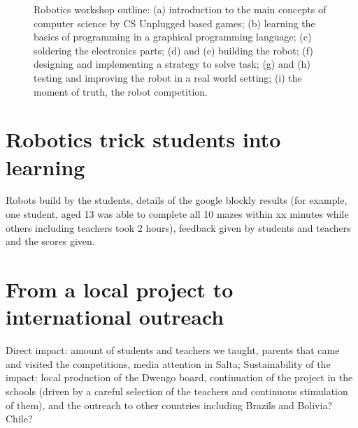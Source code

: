 \documentclass[a4paper]{llncs}
\begin{document}
\begin{figure}[htp]
\caption[]{Robotics workshop outline: (a) introduction to the main concepts of computer science by CS Unplugged based games; (b) learning the basics of programming in a graphical programming language; (c) soldering the electronics parts; (d) and (e) building the robot; (f) designing and implementing a strategy to solve task; (g) and (h) testing and improving the robot in a real world setting; (i) the moment of truth, the robot competition.}
\end{figure}

\section{Robotics trick students into learning}
Robots build by the students, details of the google blockly results (for example, one student, aged 13 was able to complete all 10 mazes within xx minutes while others including teachers took 2 hours), feedback given by students and teachers and the scores given.

\section{From a local project to international outreach}
Direct impact: amount of students and teachers we taught, parents that came and visited the competitions, media attention in Salta; Sustainability of the impact: local production of the Dwengo board, continuation of the project in the schools (driven by a careful selection of the teachers and continuous stimulation of them), and the outreach to other countries including Brazils and Bolivia? Chile?
\end{document}
